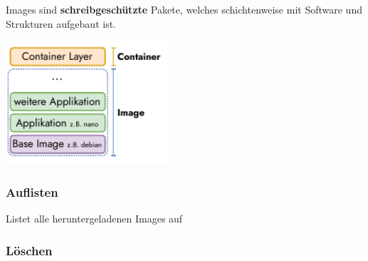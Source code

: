 \documentclass[
  10pt,
  a4paper,
  twocolumn]{article}
\newenvironment{Shaded}{}{}
\newcommand{\ExtensionTok}[1]{\textcolor[rgb]{0.84,0.23,0.29}{\textbf{#1}}}
\newcommand{\NormalTok}[1]{\textcolor[rgb]{0.14,0.16,0.18}{#1}}
\newcommand{\OperatorTok}[1]{\textcolor[rgb]{0.14,0.16,0.18}{#1}}
\begin{document}
Images sind \textbf{schreibgeschützte} Pakete, welches schichtenweise
mit Software und Strukturen aufgebaut ist.

\begin{center}
\includegraphics[width=6cm,height=\textheight]{images/docker/image_structure.pdf}
\end{center}

\subsubsection{\texorpdfstring{{\small \faTerminal\hspace{1mm}}
Auflisten}{ Auflisten}}\label{auflisten}

Listet alle heruntergeladenen Images auf

\begin{Shaded}
\end{Shaded}

\subsubsection{\texorpdfstring{{\small \faTerminal\hspace{1mm}}
Löschen}{ Löschen}}\label{luxf6schen}

\begin{Shaded}
\end{Shaded}
\end{document}
